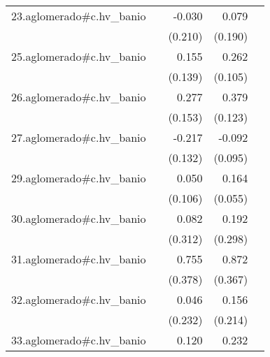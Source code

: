 {\begin{longtable}{l*{4}{D{.}{.}{-1}}}
\addlinespace
23.aglomerado#c.hv\_banio&                     &      -0.030         &       0.079         &                     \\
            &                     &     (0.210)         &     (0.190)         &                     \\
\addlinespace
25.aglomerado#c.hv\_banio&                     &       0.155         &       0.262\sym{*}  &                     \\
            &                     &     (0.139)         &     (0.105)         &                     \\
\addlinespace
26.aglomerado#c.hv\_banio&                     &       0.277         &       0.379\sym{**} &                     \\
            &                     &     (0.153)         &     (0.123)         &                     \\
\addlinespace
27.aglomerado#c.hv\_banio&                     &      -0.217         &      -0.092         &                     \\
            &                     &     (0.132)         &     (0.095)         &                     \\
\addlinespace
29.aglomerado#c.hv\_banio&                     &       0.050         &       0.164\sym{**} &                     \\
            &                     &     (0.106)         &     (0.055)         &                     \\
\addlinespace
30.aglomerado#c.hv\_banio&                     &       0.082         &       0.192         &                     \\
            &                     &     (0.312)         &     (0.298)         &                     \\
\addlinespace
31.aglomerado#c.hv\_banio&                     &       0.755\sym{*}  &       0.872\sym{*}  &                     \\
            &                     &     (0.378)         &     (0.367)         &                     \\
\addlinespace
32.aglomerado#c.hv\_banio&                     &       0.046         &       0.156         &                     \\
            &                     &     (0.232)         &     (0.214)         &                     \\
\addlinespace
33.aglomerado#c.hv\_banio&                     &       0.120         &       0.232\sym{***}&                     \\

\end{longtable}}
